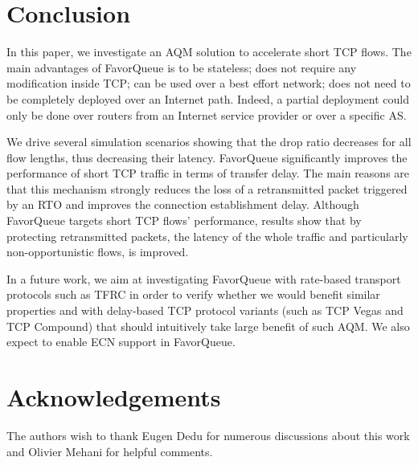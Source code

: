 \documentclass{elsart}
\begin{document}
\section{Conclusion}
\label{sec:conclu}

In this paper, we investigate an AQM solution to accelerate short TCP flows. The main advantages of FavorQueue is to be stateless; does not require any modification inside TCP; can be used over a best effort network; does not need to be completely deployed over an Internet path. Indeed, a partial deployment could only be done over routers from an Internet service provider or over a specific AS.  

We drive several simulation scenarios showing that the drop ratio decreases for all flow lengths, thus decreasing their latency. 
FavorQueue significantly improves the performance of short TCP traffic in terms of transfer delay. The main reasons are that this mechanism 
strongly reduces the loss of a retransmitted packet triggered by an RTO and improves the connection establishment delay. 
Although FavorQueue targets short TCP flows' performance, results show that by protecting retransmitted packets, the latency of the whole traffic and particularly non-opportunistic flows, is improved. 

In a future work, we aim at investigating FavorQueue with rate-based transport protocols such as TFRC in order to verify whether we would benefit similar properties and with delay-based TCP protocol variants (such as TCP Vegas and TCP Compound) that should intuitively take large benefit of such AQM. We also expect to enable ECN support in FavorQueue.

\section*{Acknowledgements}
The authors wish to thank Eugen Dedu for numerous discussions about this work and Olivier Mehani for helpful comments. 



\end{document}
